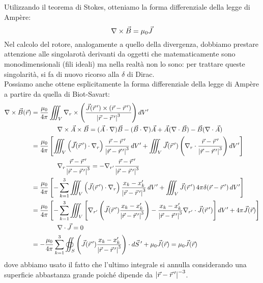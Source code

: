 \documentclass[]{article}
\begin{document}
Utilizzando il teorema di Stokes, otteniamo la forma differenziale della legge di Ampère:
\begin{equation}
	\nabla\times\vec{B} = \mu_0 \vec{J}
	\label{eq:ampere-diff}
\end{equation}
Nel calcolo del rotore, analogamente a quello della divergenza, dobbiamo prestare attenzione alle singolarotà derivanti da oggetti che matematicamente sono monodimensionali (fili ideali) ma nella realtà non lo sono: per trattare queste singolarità, si fa di nuovo ricorso alla $ \delta $ di Dirac. \\ 
%
Possiamo anche ottene esplicitamente la forma differenziale della legge di Ampère a partire da quella di Biot-Savart:
\begin{equation}
	\begin{split}
	 	\nabla\times\vec{B}(\vec{r}) &= \displaystyle\frac{\mu_0}{4\pi} \iiint_V \nabla_r \times \left( \displaystyle\frac{\vec{J}(\vec{r}\,') \times (\vec{r} - \vec{r}\,')}{\left\lvert\vec{r} - \vec{r}\,'\right\rvert^3} \right) dV' \\
				     & \qquad\qquad \nabla\times\vec{A}\times\vec{B} = (\vec{A}\cdot\nabla)\vec{B} - (\vec{B}\cdot\nabla)\vec{A} + \vec{A}(\nabla\cdot\vec{B}) - \vec{B}(\nabla\cdot\vec{A}) \\ 
				     &= \displaystyle\frac{\mu_0}{4\pi} \left[ \iiint_V \left( \vec{J}(\vec{r}\,') \cdot \nabla_r \right) \frac{\vec{r} - \vec{r}\,'}{\left\lvert\vec{r} - \vec{r}\,'\right\rvert^3} \, dV' + \iiint_V \vec{J}(\vec{r}\,') \left( \nabla_r \cdot \frac{\vec{r} - \vec{r}\,'}{\left\lvert\vec{r} - \vec{r}\,'\right\rvert^3} \right) dV' \right] \\ 
				     & \qquad\qquad \nabla_r \frac{\vec{r} - \vec{r}\,'}{\left\lvert\vec{r} - \vec{r}\,'\right\rvert^3} = - \nabla_{r'} \frac{\vec{r} - \vec{r}\,'}{\left\lvert\vec{r} - \vec{r}\,'\right\rvert^3} \\ 
				     &= \displaystyle\frac{\mu_0}{4\pi} \left[ -\displaystyle\sum_{k = 1}^{3} \iiint_V \left( \vec{J}(\vec{r}\,') \cdot \nabla_r \right) \frac{x_k - x'_k}{\left\lvert\vec{r} - \vec{r}\,'\right\rvert^3} \, dV' + \iiint_V \vec{J}(\vec{r}\,') \, 4\pi \delta(\vec{r} - \vec{r}\,') \,  dV' \right] \\
				     &=  \displaystyle\frac{\mu_0}{4\pi} \left[ -\displaystyle\sum_{k = 1}^{3} \iiint_V \left[ \nabla_{r'} \left( \vec{J}(\vec{r}\,') \frac{x_k - x'_k}{\left\lvert\vec{r} - \vec{r}\,'\right\rvert^3} \right) -  \frac{x_k - x'_k}{\left\lvert\vec{r} - \vec{r}\,'\right\rvert^3} \nabla_{r'} \cdot \vec{J}(\vec{r}\,') \right] dV' + 4\pi\vec{J}(\vec{r}) \right] \\ 
				     & \qquad\qquad \nabla\cdot\vec{J} = 0 \\ 
				     &= - \displaystyle\frac{\mu_0}{4\pi} \displaystyle\sum_{k = 1}^{3} \oiint_S \left( \vec{J}(\vec{r}\,') \frac{x_k - x'_k}{\left\lvert\vec{r} - \vec{r}\,'\right\rvert^3} \right) \cdot d\vec{S}\,' + \mu_0 \vec{J}(\vec{r}) = \mu_0 \vec{J}(\vec{r})
	\end{split}
	\label{eq:}
\end{equation}
dove abbiamo usato il fatto che l'ultimo integrale si annulla considerando una superficie abbastanza grande poiché dipende da $ \left\lvert\vec{r} - \vec{r}\,'\right\rvert^{-3} $.
\end{document}
